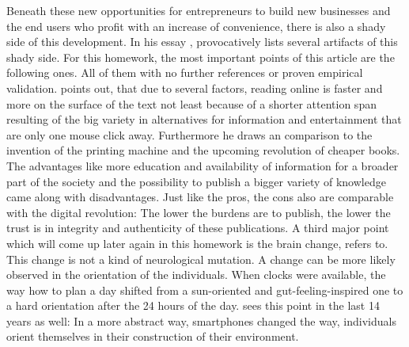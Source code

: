 \documentclass[11pt,letterpaper]{article}
\begin{document}
Beneath these new opportunities for entrepreneurs to build new businesses and the end users who profit with an increase of convenience, there is also a shady side of this development. In his essay , \cite[][]{Carr.2008} provocatively lists several artifacts of this shady side. For this homework, the most important points of this article are the following ones. All of them with no further references or proven empirical validation. \cite[][]{Carr.2008} points out, that due to several factors, reading online is faster and more on the surface of the text not least because of a shorter attention span resulting of the big variety in alternatives for information and entertainment that are only one mouse click away. Furthermore he draws an comparison to the invention of the printing machine and the upcoming revolution of cheaper books. The advantages like more education and availability of information for a broader part of the society and the possibility to publish a bigger variety of knowledge came along with disadvantages. Just like the pros, the cons also are comparable with the digital revolution: The lower the burdens are to publish, the lower the trust is in integrity and authenticity of these publications. A third major point which will come up later again in this homework is the brain change, \cite[][]{Carr.2008} refers to. This change is not a kind of neurological mutation. A change can be more likely observed in the orientation of the individuals. When clocks were available, the way how to plan a day shifted from a sun-oriented and gut-feeling-inspired one to a hard orientation after the 24 hours of the day. \cite[][]{Carr.2008} sees this point in the last 14 years as well: In a more abstract way, smartphones changed the way, individuals orient themselves in their construction of their environment.
\end{document}
